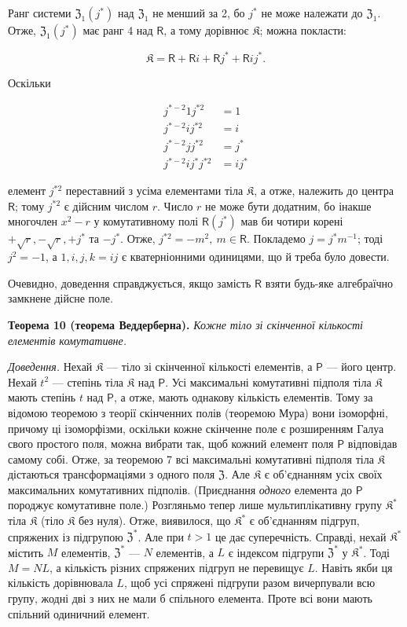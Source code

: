 \documentclass[11pt]{article}
\begin{document}
Ранг системи \(\mathfrak Z_1(j^*)\) над \(\mathfrak Z_1\) не менший за 2, бо \(j^*\) не може належати до \(\mathfrak Z_1\). Отже, \(\mathfrak Z_1(j^*)\) має ранг 4 над \(\mathsf{R}\), а тому дорівнює \(\mathfrak K\); можна покласти:

\[
\mathfrak K=\mathsf R+\mathsf Ri+\mathsf Rj^*+\mathsf Rij^*.
\]

Оскільки

\[
\begin{aligned}
j^{*-2}1j^{*2}&=1\\
j^{*-2}ij^{*2}&=i\\
j^{*-2}jj^{*2}&=j^*\\
j^{*-2}ij^*j^{*2}&=ij^*
\end{aligned}
\]

елемент \(j^{*2}\) переставний з усіма елементами тіла \(\mathfrak K\), а отже, належить до центра \(\mathsf{R}\); тому \(j^{*2}\) є дійсним числом \(r\). Число \(r\) не може бути додатним, бо інакше многочлен \(x^2-r\) у комутативному полі \(\mathsf{R}(j^*)\) мав би чотири корені \(+\sqrt r,-\sqrt r,+j^*\) та \(-j^*\). Отже, \(j^{*2}=-m^2,\ m\in \mathsf{R}\). Покладемо \(j=j^*m^{-1}\); тоді \(j^2=-1\), а \(1,i,j,k=ij\) є кватерніонними одиницями, що й треба було довести.

Очевидно, доведення справджується, якщо замість \(\mathsf{R}\) взяти будь-яке алгебраїчно замкнене дійсне поле.

\textbf{Теорема 10 (теорема Веддерберна).} \emph{Кожне тіло зі скінченної кількості елементів комутативне.}

\emph{Доведення.} Нехай \(\mathfrak K\) --- тіло зі скінченної кількості елементів, а \(\mathsf P\) --- його центр. Нехай \(t^2\) --- степінь тіла \(\mathfrak K\) над \(\mathsf P\). Усі максимальні комутативні підполя тіла \(\mathfrak K\) мають степінь \(t\) над \(\mathsf P\), а отже, мають однакову кількість елементів. Тому за відомою теоремою з теорії скінченних полів (теоремою Мура) вони ізоморфні, причому ці ізоморфізми, оскільки кожне скінченне поле є розширенням Галуа свого простого поля, можна вибрати так, щоб кожний елемент поля \(\mathsf P\) відповідав самому собі. Отже, за теоремою 7 всі максимальні комутативні підполя тіла \(\mathfrak K\) дістаються трансформаціями з одного поля \(\mathfrak Z\). Але \(\mathfrak K\) є об'єднанням усіх своїх максимальних комутативних підполів. (Приєднання \emph{одного} елемента до \(\mathsf P\) породжує комутативне поле.) Розгляньмо тепер лише мультиплікативну групу \(\mathfrak K^*\) тіла \(\mathfrak K\) (тіло \(\mathfrak K\) без нуля). Отже, виявилося, що \(\mathfrak K^*\) є об'єднанням підгруп, спряжених із підгрупою \(\mathfrak Z^*\). Але при \(t>1\) це дає суперечність. Справді, нехай \(\mathfrak K^*\) містить \(M\) елементів, \(\mathfrak Z^*\) --- \(N\) елементів, а \(L\) є індексом підгрупи \(\mathfrak Z^*\) у \(\mathfrak K^*\). Тоді \(M=NL\), а кількість різних спряжених підгруп не перевищує \(L\). Навіть якби ця кількість дорівнювала \(L\), щоб усі спряжені підгрупи разом вичерпували всю групу, жодні дві з них не мали б спільного елемента. Проте всі вони мають спільний одиничний елемент.
\end{document}

